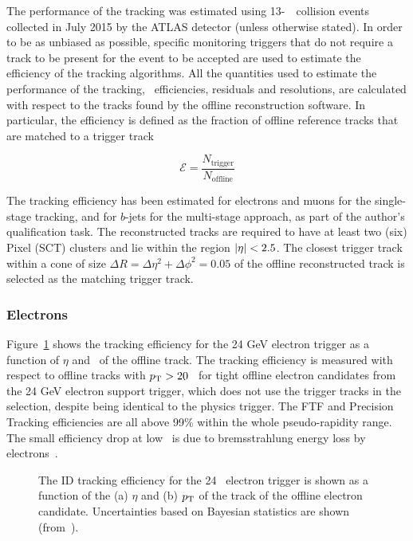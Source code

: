 			The performance of the tracking was estimated using 13-\TeV\ \pp\ collision events collected in July 2015 by the \ac{ATLAS} detector (unless otherwise stated). In order to be as unbiased as possible, specific monitoring triggers that do not require a track to be present for the event to be accepted are used to estimate the efficiency of the tracking algorithms. All the quantities used to estimate the performance of the tracking, \ie\ efficiencies, residuals and resolutions, are calculated with respect to the tracks found by the offline reconstruction software. In particular, the efficiency is defined as the fraction of offline reference tracks that are matched to a trigger track 

			\begin{equation}
				\mathcal{E} = \frac{N_{\mathrm{trigger}}}{N_{\mathrm{offline}}}
				\label{eq:trig_eff}
			\end{equation}

			The tracking efficiency has been estimated for electrons and muons for the single-stage tracking, and for $b$-jets for the multi-stage approach, as part of the author's qualification task. The reconstructed tracks are required to have at least two (six) Pixel (\ac{SCT}) clusters and lie within the region $|\eta| < 2.5$. The closest trigger track within a cone of size $\Delta R =  \Delta \eta^2 + \Delta \phi^2 = 0.05$ of the offline reconstructed track is selected as the matching trigger track.


			\subsubsection*{Electrons}

				Figure~\ref{fig:ele_idtrig_eff} shows the tracking efficiency for the 24 GeV electron trigger as a function of $\eta$ and \pt\ of the offline track. The tracking efficiency is measured with respect to offline tracks with $p_{\mathrm{T}} > 20$ \GeV\ for tight offline electron candidates from the 24 GeV electron support trigger, which does not use the trigger tracks in the selection, despite being identical to the physics trigger. The \ac{FTF} and Precision Tracking efficiencies are all above 99\% within the whole pseudo-rapidity range. The small efficiency drop at low \pt\ is due to bremsstrahlung energy loss by electrons~\cite{ATLASTrigger2015}.

				\begin{figure}[!htb]
					\begin{center}
						\hspace{0.05\textwidth}
						\hspace{0.05\textwidth}
					\end{center}
					\caption{The ID tracking efficiency for the 24 \GeV\ electron trigger is shown as a function of the (a) $\eta$ and (b) $p_{\mathrm{T}}$ of the track of the offline electron candidate. Uncertainties based on Bayesian statistics are shown (from~\cite{ATLASTrigger2015}).}
					\label{fig:ele_idtrig_eff}
				\end{figure}


